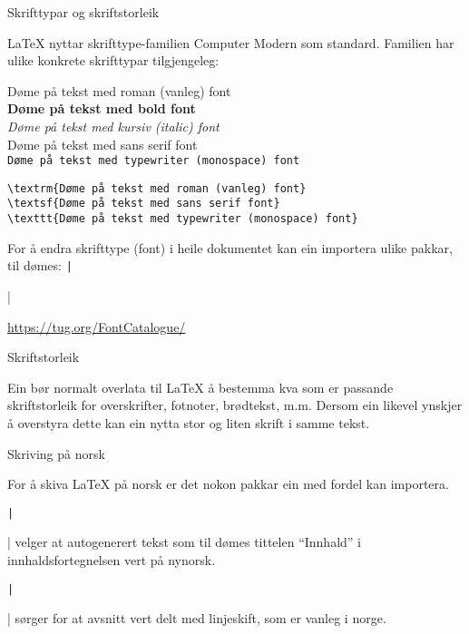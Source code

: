 \begin{frame}[containsverbatim]{Skrifttypar og skriftstorleik}
	
\LaTeX{} nyttar skrifttype-familien Computer Modern som standard. Familien har ulike konkrete skrifttypar tilgjengeleg:
	
\textrm{Døme på tekst med roman (vanleg) font}\\
\textbf{Døme på tekst med bold font}\\
\textit{Døme på tekst med kursiv (italic) font}\\
\textsf{Døme på tekst med sans serif font}\\
\texttt{Døme på tekst med typewriter (monospace) font}

	\begin{verbatim}
\textrm{Døme på tekst med roman (vanleg) font}
\textsf{Døme på tekst med sans serif font}
\texttt{Døme på tekst med typewriter (monospace) font}
	\end{verbatim}
	
	For å endra skrifttype (font) i heile dokumentet kan ein importera ulike pakkar, til dømes: \texttt|\usepackage{tgbonum}|
	
	\url{https://tug.org/FontCatalogue/}
	
	
\end{frame}


\begin{frame}[containsverbatim]{Skriftstorleik}
	
Ein bør normalt overlata til \LaTeX{} å bestemma kva som er passande skriftstorleik for overskrifter, fotnoter, brødtekst, m.m. Dersom ein likevel ynskjer å overstyra dette kan ein nytta {\huge stor} og {\tiny liten} skrift i samme tekst.
	
	
\end{frame}

\begin{frame}{Skriving på norsk}
	
	For å skiva \LaTeX{} på norsk er det nokon pakkar ein med fordel kan importera.
	
	\texttt|\usepackage[nynorsk]{babel}| velger at autogenerert tekst som til dømes tittelen ``Innhald'' i innhaldsfortegnelsen vert på nynorsk.
	
	\texttt|\usepackage{parskip}| sørger for at avsnitt vert delt med linjeskift, som er vanleg i norge.
	
\end{frame}

